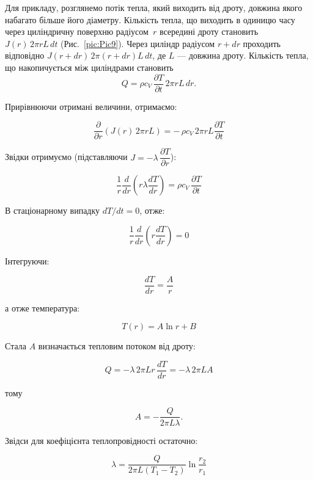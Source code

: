 Для прикладу, розглянемо потік тепла, який виходить від дроту, довжина якого набагато більше його діаметру. Кількість тепла, що виходить в одиницю часу через циліндричну поверхню радіусом~$r$ всередині дроту становить $J(r)\,2\pi r L\,dt$ (Рис.~\ref{pic:Pic9}). Через циліндр радіусом $r+dr$ проходить відповідно $J(r+dr)\,2\pi(r+dr)L\,dt$, де $L$ --- довжина дроту. Кількість тепла, що накопичується між циліндрами становить
\[
	Q = \rho c_V\,\frac{\partial T}{\partial t}\,2\pi r L\,dr.
\]

Прирівнюючи отримані величини, отримаємо:

\begin{equation}
	\frac{\partial}{\partial r}\left( J(r)\,2\pi r L \right)
	=
	-\,\rho c_V\,2\pi r L \frac{\partial T}{\partial t}
	\label{eq:159.10}
\end{equation}

Звідки отримуємо (підставляючи $J=-\lambda\,\dfrac{\partial T}{\partial r}$):

\begin{equation}
	\frac{1}{r}
	\frac{d}{dr}
	\left( r\lambda\frac{dT}{dr} \right)
	=
	\rho c_V\,\frac{\partial T}{\partial t}
	\label{eq:159.11}
\end{equation}

В стаціонарному випадку $dT/dt = 0$, отже:

\begin{equation}
	\frac{1}{r}
	\frac{d}{dr}
	\left( r\frac{dT}{dr} \right) = 0
	\label{eq:159.12}
\end{equation}

Інтегруючи:

\begin{equation}
	\frac{dT}{dr} = \frac{A}{r}
	\label{eq:159.13}
\end{equation}

а отже температура:

\begin{equation}
	T(r) = A\ln r + B
	\label{eq:159.14}
\end{equation}

Стала $A$ визначається тепловим потоком від дроту:

\[
	Q = -\lambda\,2\pi L r\,\frac{dT}{dr}
	= -\lambda\,2\pi L A
\]

тому

\[
	A = -\frac{Q}{2\pi L \lambda}.
\]

Звідси для коефіцієнта теплопровідності остаточно:

\begin{equation}
	\lambda =
	\frac{Q}{2\pi L (T_1 - T_2)}
	\ln\frac{r_2}{r_1}
	\label{eq:159.15}
\end{equation}

